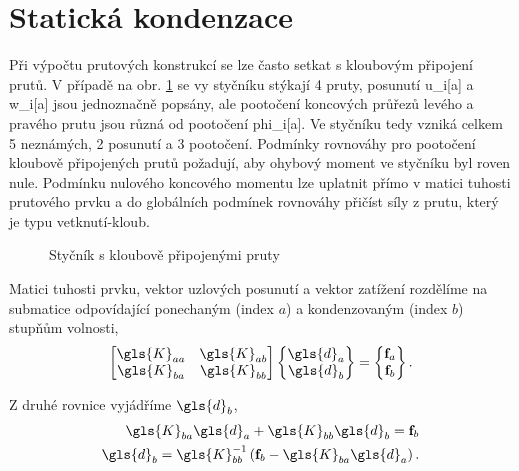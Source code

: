\section{Statická kondenzace}

Při výpočtu prutových konstrukcí se lze často setkat s kloubovým připojení prutů. V případě na obr. \ref{fig:node_phis} se vy styčníku stýkají 4 pruty, posunutí \gls{u_i}[a] a \gls{w_i}[a] jsou jednoznačně popsány, ale pootočení koncových průřezů levého a pravého prutu jsou různá od pootočení \gls{phi_i}[a]. Ve styčníku tedy vzniká celkem 5 neznámých, 2 posunutí a 3 pootočení. Podmínky rovnováhy pro pootočení kloubově připojených prutů požadují, aby ohybový moment ve styčníku byl roven nule. Podmínku nulového koncového momentu lze uplatnit přímo v matici tuhosti prutového prvku a do globálních podmínek rovnováhy přičíst síly z prutu, který je typu vetknutí-kloub.

\begin{figure}[H]
    
    \caption{Styčník s kloubově připojenými pruty}
    \label{fig:node_phis}
\end{figure}

Matici tuhosti prvku, vektor uzlových posunutí a vektor zatížení rozdělíme na submatice odpovídající ponechaným (index $a$) a kondenzovaným (index $b$) stupňům volnosti,
\begin{equation}
    \begin{bmatrix}
        \gls{K}_{aa} & \gls{K}_{ab} \\
        \gls{K}_{ba} & \gls{K}_{bb}
    \end{bmatrix}
    \begin{Bmatrix}
        \gls{d}_a \\
        \gls{d}_b
    \end{Bmatrix}
    =
    \begin{Bmatrix}
        \matr{f}_a \\
        \matr{f}_b
    \end{Bmatrix}.
\end{equation}

Z druhé rovnice vyjádříme $\gls{d}_{b}$,
\begin{equation}
    \begin{aligned}
        \gls{K}_{ba} \gls{d}_a + \gls{K}_{bb} \gls{d}_{b} = \matr{f}_b \\
        \gls{d}_{b} = \gls{K}_{bb}^{-1} \left( \matr{f}_{b} - \gls{K}_{ba} \gls{d}_a \right).
    \end{aligned}
\end{equation}

